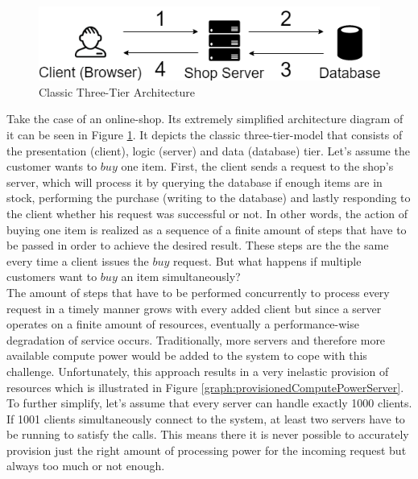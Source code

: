 \begin{figure}[ht]
    \includegraphics[width=0.9\linewidth]{images/drawio/3tier-oneclient.png}\centering
    \caption {Classic Three-Tier Architecture}
    \label{fig:3tier1client}
\end{figure}

Take the case of an online-shop. Its extremely simplified architecture diagram of it can be seen in Figure \ref{fig:3tier1client}. It depicts the classic three-tier-model that consists of the presentation (client), logic (server) and data (database) tier.\autocite{Ramirez2000Three-TierArchitecture} Let's assume the customer wants to $buy$ one item. First, the client sends a request to the shop's server, which will process it by querying the database if enough items are in stock, performing the purchase (writing to the database) and lastly responding to the client whether his request was successful or not. In other words, the action of buying one item is realized as a sequence of a finite amount of steps that have to be passed in order to achieve the desired result. These steps are the the same every time a client issues the $buy$ request. But what happens if multiple customers want to $buy$ an item simultaneously? \\
The amount of steps that have to be performed concurrently to process every request in a timely manner grows with every added client but since a server operates on a finite amount of resources, eventually a performance-wise degradation of service occurs. Traditionally, more servers and therefore more available compute power would be added to the system to cope with this challenge. Unfortunately, this approach results in a very inelastic provision of resources which is illustrated in Figure \ref{graph:provisionedComputePowerServer}. To further simplify, let's assume that every server can handle exactly 1000 clients. If 1001 clients simultaneously connect to the system, at least two servers have to be running to satisfy the calls. This means there it is never possible to accurately provision just the right amount of processing power for the incoming request but always too much or not enough. 

